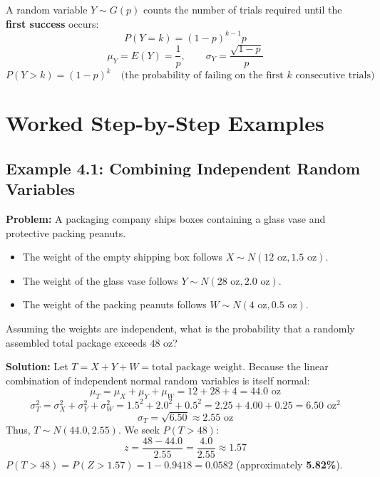 \begin{lessonbox}
A random variable $Y \sim G(p)$ counts the number of trials required until the \textbf{first success} occurs:
\begin{equation}
  P(Y = k) = (1-p)^{k-1} p
\end{equation}
\begin{equation}
  \mu_Y = E(Y) = \frac{1}{p}, \qquad \sigma_Y = \frac{\sqrt{1-p}}{p}
\end{equation}
\begin{equation}
  P(Y > k) = (1-p)^k \quad \text{(the probability of failing on the first $k$ consecutive trials)}
\end{equation}
\end{lessonbox}

\section{Worked Step-by-Step Examples}

\subsection*{Example 4.1: Combining Independent Random Variables}
\textbf{Problem:} A packaging company ships boxes containing a glass vase and protective packing peanuts.
\begin{itemize}[leftmargin=1.2em]
  \item The weight of the empty shipping box follows $X \sim N(12\text{ oz}, 1.5\text{ oz})$.
  \item The weight of the glass vase follows $Y \sim N(28\text{ oz}, 2.0\text{ oz})$.
  \item The weight of the packing peanuts follows $W \sim N(4\text{ oz}, 0.5\text{ oz})$.
\end{itemize}
Assuming the weights are independent, what is the probability that a randomly assembled total package exceeds $48\text{ oz}$?

\textbf{Solution:}
Let $T = X + Y + W = \text{total package weight}$.
Because the linear combination of independent normal random variables is itself normal:
\[ \mu_T = \mu_X + \mu_Y + \mu_W = 12 + 28 + 4 = 44.0\text{ oz} \]
\[ \sigma_T^2 = \sigma_X^2 + \sigma_Y^2 + \sigma_W^2 = 1.5^2 + 2.0^2 + 0.5^2 = 2.25 + 4.00 + 0.25 = 6.50\text{ oz}^2 \]
\[ \sigma_T = \sqrt{6.50} \approx 2.55\text{ oz} \]
Thus, $T \sim N(44.0, 2.55)$. We seek $P(T > 48)$:
\[ z = \frac{48 - 44.0}{2.55} = \frac{4.0}{2.55} \approx 1.57 \]
$P(T > 48) = P(Z > 1.57) = 1 - 0.9418 = \mathbf{0.0582}$ (approximately \textbf{5.82\%}).

